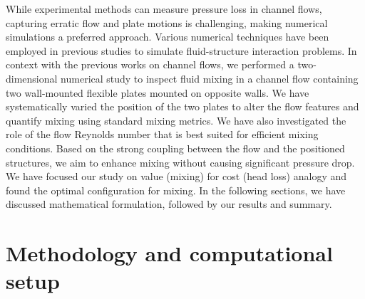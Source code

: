 \documentclass[reprint,a4paper,fleqn]{cas-dc} %
\begin{document}
	While experimental methods can measure pressure loss in channel flows, capturing erratic flow and plate motions is challenging, making numerical simulations a preferred approach. Various numerical techniques have been employed in previous studies to simulate fluid-structure interaction problems. In context with the previous works on channel flows, we performed a two-dimensional numerical study to inspect fluid mixing in a channel flow containing two wall-mounted flexible plates mounted on opposite walls. We have systematically varied the position of the two plates to alter the flow features and quantify mixing using standard mixing metrics. We have also investigated the role of the flow Reynolds number that is best suited for efficient mixing conditions. Based on the strong coupling between the flow and the positioned structures, we aim to enhance mixing without causing significant pressure drop. We have focused our study on value (mixing) for cost (head loss) analogy and found the optimal configuration for mixing. In the following sections, we have discussed mathematical formulation, followed by our results and summary.
	
	
	\section{Methodology and computational setup}\label{sec:maths}
	
\end{document}
